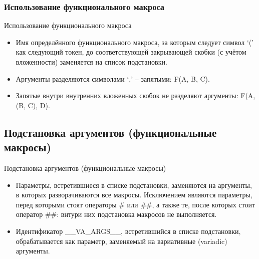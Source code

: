     \subsubsection{Использование функционального макроса}
    \begin{frame}{Использование функционального макроса}
        \begin{itemize}
            \item Имя определённого функционального макроса, за которым следует символ `(' как следующий токен,
                до соответствующей закрывающей скобки (с учётом вложенности) заменяется на список подстановки.
            \item Аргументы разделяются символами `,' -- запятыми: F(A, B, C).
            \item Запятые внутри внутренних вложенных скобок не разделяют аргументы: F(A, (B, C), D).
        \end{itemize}
    \end{frame}
    \subsection{Подстановка аргументов (функциональные макросы)}
    \begin{frame}{Подстановка аргументов (функциональные макросы)}
        \begin{itemize}
            \item Параметры, встретившиеся в списке подстановки, заменяются на аргументы,
                в которых разворачиваются все макросы. Исключением являются
                параметры, перед которыми стоят операторы \# или \#\#, а также те,
                после которых стоит оператор \#\#: внтури них подстановка макросов не выполняется.
            \item Идентификатор \_\_VA\_ARGS\_\_, встретившийся в списке подстановки,
                обрабатывается как параметр, заменяемый на вариативные (variadic) аргументы.
        \end{itemize}
    \end{frame}
